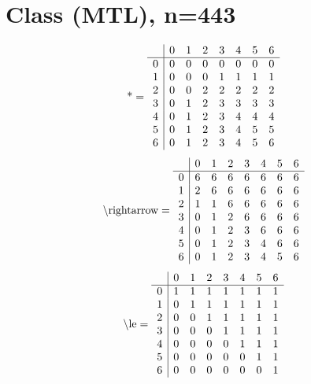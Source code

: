 \documentclass[11pt]{article}
\begin{document}
\section{Class (MTL), n=443}
\[\text{*} = 
\begin{array}{r | r r r r r r r}
 & 0 & 1 & 2 & 3 & 4 & 5 & 6 \\ \hline
0 & 0 & 0 & 0 & 0 & 0 & 0 & 0 \\
1 & 0 & 0 & 0 & 1 & 1 & 1 & 1 \\
2 & 0 & 0 & 2 & 2 & 2 & 2 & 2 \\
3 & 0 & 1 & 2 & 3 & 3 & 3 & 3 \\
4 & 0 & 1 & 2 & 3 & 4 & 4 & 4 \\
5 & 0 & 1 & 2 & 3 & 4 & 5 & 5 \\
6 & 0 & 1 & 2 & 3 & 4 & 5 & 6 \\
\end{array}
\]
\[\text{\textbackslash rightarrow} = 
\begin{array}{r | r r r r r r r}
 & 0 & 1 & 2 & 3 & 4 & 5 & 6 \\ \hline
0 & 6 & 6 & 6 & 6 & 6 & 6 & 6 \\
1 & 2 & 6 & 6 & 6 & 6 & 6 & 6 \\
2 & 1 & 1 & 6 & 6 & 6 & 6 & 6 \\
3 & 0 & 1 & 2 & 6 & 6 & 6 & 6 \\
4 & 0 & 1 & 2 & 3 & 6 & 6 & 6 \\
5 & 0 & 1 & 2 & 3 & 4 & 6 & 6 \\
6 & 0 & 1 & 2 & 3 & 4 & 5 & 6 \\
\end{array}
\]
\[\text{\textbackslash le} = 
\begin{array}{r | r r r r r r r}
 & 0 & 1 & 2 & 3 & 4 & 5 & 6 \\ \hline
0 & 1 & 1 & 1 & 1 & 1 & 1 & 1 \\
1 & 0 & 1 & 1 & 1 & 1 & 1 & 1 \\
2 & 0 & 0 & 1 & 1 & 1 & 1 & 1 \\
3 & 0 & 0 & 0 & 1 & 1 & 1 & 1 \\
4 & 0 & 0 & 0 & 0 & 1 & 1 & 1 \\
5 & 0 & 0 & 0 & 0 & 0 & 1 & 1 \\
6 & 0 & 0 & 0 & 0 & 0 & 0 & 1 \\
\end{array}
\]
\end{document}
